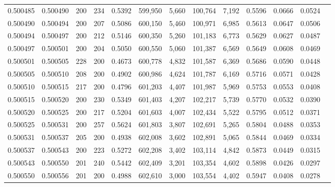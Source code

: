 \begin{tabular}{rrrrrrrrrrrrr}
0.500485 & 0.500490 &    200 & 234 &                                     0.5392 & 599,950 &   5,660 & 100,764 &   7,192 & 0.5596 & 0.0666 & 0.0524 \\
0.500490 & 0.500494 &    200 & 207 &                                     0.5086 & 600,150 &   5,460 & 100,971 &   6,985 & 0.5613 & 0.0647 & 0.0506 \\
0.500494 & 0.500497 &    200 & 212 &                                     0.5146 & 600,350 &   5,260 & 101,183 &   6,773 & 0.5629 & 0.0627 & 0.0487 \\
0.500497 & 0.500501 &    200 & 204 &                                     0.5050 & 600,550 &   5,060 & 101,387 &   6,569 & 0.5649 & 0.0608 & 0.0469 \\
0.500501 & 0.500505 &    228 & 200 &                                     0.4673 & 600,778 &   4,832 & 101,587 &   6,369 & 0.5686 & 0.0590 & 0.0448 \\
0.500505 & 0.500510 &    208 & 200 &                                     0.4902 & 600,986 &   4,624 & 101,787 &   6,169 & 0.5716 & 0.0571 & 0.0428 \\
0.500510 & 0.500515 &    217 & 200 &                                     0.4796 & 601,203 &   4,407 & 101,987 &   5,969 & 0.5753 & 0.0553 & 0.0408 \\
0.500515 & 0.500520 &    200 & 230 &                                     0.5349 & 601,403 &   4,207 & 102,217 &   5,739 & 0.5770 & 0.0532 & 0.0390 \\
0.500520 & 0.500525 &    200 & 217 &                                     0.5204 & 601,603 &   4,007 & 102,434 &   5,522 & 0.5795 & 0.0512 & 0.0371 \\
0.500525 & 0.500531 &    200 & 257 &                                     0.5624 & 601,803 &   3,807 & 102,691 &   5,265 & 0.5804 & 0.0488 & 0.0353 \\
0.500531 & 0.500537 &    205 & 200 &                                     0.4938 & 602,008 &   3,602 & 102,891 &   5,065 & 0.5844 & 0.0469 & 0.0334 \\
0.500537 & 0.500543 &    200 & 223 &                                     0.5272 & 602,208 &   3,402 & 103,114 &   4,842 & 0.5873 & 0.0449 & 0.0315 \\
0.500543 & 0.500550 &    201 & 240 &                                     0.5442 & 602,409 &   3,201 & 103,354 &   4,602 & 0.5898 & 0.0426 & 0.0297 \\
0.500550 & 0.500556 &    201 & 200 &                                     0.4988 & 602,610 &   3,000 & 103,554 &   4,402 & 0.5947 & 0.0408 & 0.0278 \\

\end{tabular}
